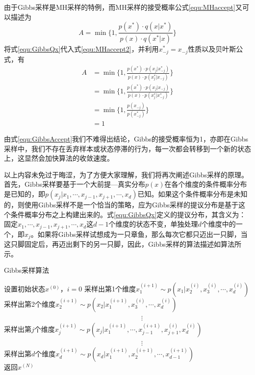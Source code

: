 由于Gibbs采样是MH采样的特例，而MH采样的接受概率公式\eqref{equ:MHaccept}又可以描述为
\begin{equation}\label{equ:MHaccept2}
A = \min\Big\{1, \frac{p(x^*)\cdot q(x|x^*)}{p(x)\cdot q(x^*|x)} \Big\}
\end{equation}
将式\eqref{equ:GibbsQx}代入式\eqref{equ:MHaccept2}，并利用$x^*_{-j} = x_{-j}$性质以及贝叶斯公式，有
\begin{equation}\label{equ:GibbsAccept}
\begin{split}
A &= \min\bigg\{1, \frac{p(x^*)\cdot p(x_j|x^*_{-j})}{p(x)\cdot p(x^*_j|x_{-j})} \bigg\}\\
&=\min\bigg\{1, \frac{p(x^*)\cdot p(x_j|x_{-j})}{p(x)\cdot p(x^*_j|x^*_{-j})} \bigg\}\\
&=\min\bigg\{1, \frac{p(x_{-j})}{p(x^*_{-j})} \bigg\}\\
&=1
\end{split}
\end{equation}

由式\eqref{equ:GibbsAccept}我们不难得出结论，Gibbs的接受概率恒为1，亦即在Gibbs采样中，我们不存在丢弃样本或状态停滞的行为，每一次都会转移到一个新的状态上，这显然会加快算法的收敛速度。

以上内容未免过于晦涩，为了方便大家理解，我们将再次阐述Gibbs采样的原理。首先，Gibbs采样要基于一个大前提---真实分布$p(x)$在各个维度的条件概率分布是已知的，即$p(x_j|x_1,\cdots, x_{j-1}, x_{j+1}, \cdots, x_d)$已知。如果这个条件概率分布是未知的，则使用Gibbs采样不是一个恰当的策略，应为Gibbs采样的提议分布是基于这个条件概率分布之上构建出来的。式\eqref{equ:GibbsQx}定义的提议分布，其含义为：固定$x_1,\cdots, x_{j-1}, x_{j+1}, \cdots, x_d$这$d-1$个维度的状态不变，单独处理$d$个维度中的一个，即$x_j$。如果将Gibbs采样试想成为一只章鱼，那么每次它都只迈出一只脚，当这只脚固定后，再迈出剩下的另一只脚，因此，Gibbs采样的算法描述如算法所示。

\vspace{1em}
\begin{minipage}{0.8\textwidth}\centering
\begin{algorithm}[H]\label{alg:Gibbs}
 \caption{Gibbs采样算法}
设置初始状态$x^{(0)}$，$i=0$\;
{
采样出第1个维度$x_1^{(i+1)} \sim p(x_1|x_2^{(i)}, x_3^{(i)}, \cdots, x_d^{(i)})$\\
采样出第2个维度$x_2^{(i+1)} \sim p(x_2|x_1^{(i+1)}, x_3^{(i)}, \cdots, x_d^{(i)})$\\
~~~~~~~~~~~~~~~~~~~~~~~~~~~~~~~~~~~~~~~~$\vdots$\\
采样出第$j$个维度$x_j^{(i+1)} \sim p(x_j|x_1^{(i+1)},  \cdots, x_{j-1}^{(i+1)}, x_{j+1}^{(i)}, x_d^{(i)})$\\
~~~~~~~~~~~~~~~~~~~~~~~~~~~~~~~~~~~~~~~~$\vdots$\\
采样出第$d$个维度$x_d^{(i+1)} \sim p(x_d|x_1^{(i+1)}, x_2^{(i+1)}, \cdots, x_{d-1}^{(i+1)})$\\
}
返回$x^{(N)}$
\end{algorithm}
\end{minipage}
\vspace{1em}

